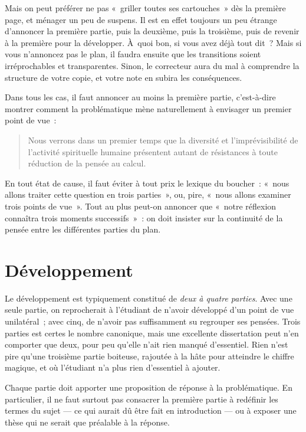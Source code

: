 \documentclass[a4paper]{article}
\begin{document}
Mais on peut préférer ne pas « griller toutes ses cartouches » dès la
première page, et ménager un peu de suspens. Il est en effet toujours un
peu étrange d'annoncer la première partie, puis la deuxième, puis la
troisième, puis de revenir à la première pour la développer. À quoi bon,
si vous avez déjà tout dit ? Mais si vous n'annoncez pas le plan, il
faudra ensuite que les transitions soient irréprochables et
transparentes. Sinon, le correcteur aura du mal à comprendre la
structure de votre copie, et votre note en subira les conséquences.

Dans tous les cas, il faut annoncer au moins la première partie,
c'est-à-dire montrer comment la problématique mène naturellement à
envisager un premier point de vue :

\begin{quote}
Nous verrons dans un premier temps que la diversité et
l'imprévisibilité de l'activité spirituelle humaine présentent autant
de résistances à toute réduction de la pensée au calcul.
\end{quote}

En tout état de cause, il faut éviter à tout prix le lexique du
boucher : « nous allons traiter cette question en trois parties », ou,
pire, « nous allons examiner trois points de vue ». Tout au plus peut-on
annoncer que « notre réflexion connaîtra trois moments successifs » : on
doit insister sur la continuité de la pensée entre les différentes
parties du plan.
\section{Développement}
\label{sec-3}


Le développement est typiquement constitué de \emph{deux à quatre parties}.
Avec une seule partie, on reprocherait à l'étudiant de n'avoir développé
d'un point de vue unilatéral ; avec cinq, de n'avoir pas suffisamment su
regrouper ses pensées. Trois parties est certes le nombre canonique,
mais une excellente dissertation peut n'en comporter que deux, pour peu
qu'elle n'ait rien manqué d'essentiel. Rien n'est pire qu'une troisième
partie boiteuse, rajoutée à la hâte pour atteindre le chiffre magique,
et où l'étudiant n'a plus rien d'essentiel à ajouter.

Chaque partie doit apporter une proposition de réponse à la
problématique. En particulier, il ne faut surtout pas consacrer la
première partie à redéfinir les termes du sujet --- ce qui aurait dû
être fait en introduction --- ou à exposer une thèse qui ne serait que
préalable à la réponse.
\end{document}
